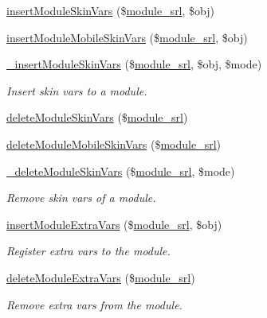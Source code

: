 \begin{DoxyCompactItemize}
\hyperlink{classmoduleController_ad044df4dde2053b5dcbaf5077822290c}{insert\+Module\+Skin\+Vars} (\$\hyperlink{ko_8install_8php_a370bb6450fab1da3e0ed9f484a38b761}{module\+\_\+srl}, \$obj)
\item 
\hyperlink{classmoduleController_a6c7aab59734028d1c980053a75437a45}{insert\+Module\+Mobile\+Skin\+Vars} (\$\hyperlink{ko_8install_8php_a370bb6450fab1da3e0ed9f484a38b761}{module\+\_\+srl}, \$obj)
\item 
\hyperlink{classmoduleController_aea2dfb4f6a1d31acdbebf131058494cd}{\+\_\+insert\+Module\+Skin\+Vars} (\$\hyperlink{ko_8install_8php_a370bb6450fab1da3e0ed9f484a38b761}{module\+\_\+srl}, \$obj, \$mode)
\begin{DoxyCompactList}\small\item\em Insert skin vars to a module. \end{DoxyCompactList}\item 
\hyperlink{classmoduleController_ad85915b5cf2a31804f673cfc3320ac75}{delete\+Module\+Skin\+Vars} (\$\hyperlink{ko_8install_8php_a370bb6450fab1da3e0ed9f484a38b761}{module\+\_\+srl})
\item 
\hyperlink{classmoduleController_a16feed706aef2613cc417c68cb06ba8a}{delete\+Module\+Mobile\+Skin\+Vars} (\$\hyperlink{ko_8install_8php_a370bb6450fab1da3e0ed9f484a38b761}{module\+\_\+srl})
\item 
\hyperlink{classmoduleController_a88baeaa3755f270af223e17e7a96d20a}{\+\_\+delete\+Module\+Skin\+Vars} (\$\hyperlink{ko_8install_8php_a370bb6450fab1da3e0ed9f484a38b761}{module\+\_\+srl}, \$mode)
\begin{DoxyCompactList}\small\item\em Remove skin vars of a module. \end{DoxyCompactList}\item 
\hyperlink{classmoduleController_a1a8373bfcd3e1e8bc88f41bb777ad486}{insert\+Module\+Extra\+Vars} (\$\hyperlink{ko_8install_8php_a370bb6450fab1da3e0ed9f484a38b761}{module\+\_\+srl}, \$obj)
\begin{DoxyCompactList}\small\item\em Register extra vars to the module. \end{DoxyCompactList}\item 
\hyperlink{classmoduleController_aff9b45ce153dcad735896f56fe60516f}{delete\+Module\+Extra\+Vars} (\$\hyperlink{ko_8install_8php_a370bb6450fab1da3e0ed9f484a38b761}{module\+\_\+srl})
\begin{DoxyCompactList}\small\item\em Remove extra vars from the module. \end{DoxyCompactList}\item 

\end{DoxyCompactItemize}

